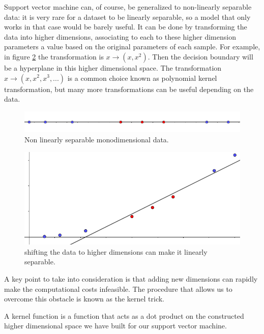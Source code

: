 \documentclass[a4paper]{report}
\begin{document}
Support vector machine can, of course, be generalized to non-linearly separable data:
it is very rare for a dataset to be linearly separable, so a model that only works in that case would be barely useful.
It can be done by transforming the data into higher dimensions, associating to each to these higher dimension parameters a value based on the original parameters of each sample.
For example, in figure \ref{2dim} the transformation is $x \xrightarrow{}(x,x^2)$.
Then the decision boundary will be a hyperplane in this higher dimensional space.
The transformation $x \xrightarrow{} (x, x^2, x^3, ...)$ is a common choice known as polynomial kernel transformation, but many more transformations can be useful depending on the data.

\begin{figure} [H]
    \centering
    \includegraphics [width=\textwidth ]{svm/1dim_ns.png}
    \caption{Non linearly separable monodimensional data.}
    \label{1dim_ns}
\end{figure}

\begin{figure} [H]
    \centering
    \includegraphics [width=\textwidth ]{svm/2dim.png}
    \caption{shifting the data to higher dimensions can make it linearly separable.}
    \label{2dim}
\end{figure}

A key point to take into consideration is that adding new dimensions can rapidly make the computational costs infeasible.
The procedure that allows us to overcome this obstacle is known as the kernel trick.

A kernel function is a function that acts as a dot product on the constructed higher dimensional space we have built for our support vector machine.
\end{document}
